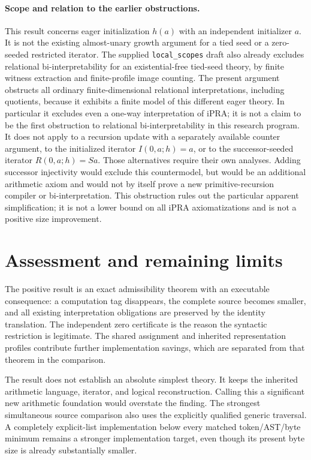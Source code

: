 \documentclass[11pt,letterpaper]{article}
\theoremstyle{definition}\newtheorem{definition}[theorem]{Definition}
\theoremstyle{remark}\newtheorem{remark}[theorem]{Remark}
\begin{document}
\paragraph{Scope and relation to the earlier obstructions.}
This result concerns eager initialization $h(a)$ with an independent
initializer $a$.  It is not the existing almost-unary growth argument
for a tied seed or a zero-seeded restricted iterator.  The supplied
\texttt{local\_scopes} draft also already excludes relational
bi-interpretability for an existential-free tied-seed theory, by finite
witness extraction and finite-profile image counting.  The present
argument obstructs all ordinary finite-dimensional relational
interpretations, including quotients, because it exhibits a finite
model of this different eager theory.  In particular it excludes even
a one-way interpretation of iPRA; it is not a claim to be the first
obstruction to relational bi-interpretability in this research program.
It does not apply to a recursion
update with a separately available counter argument, to the initialized
iterator $I(0,a;h)=a$, or to the successor-seeded iterator
$R(0,a;h)=Sa$.  Those alternatives require their own analyses.
Adding successor injectivity would exclude this countermodel, but would
be an additional arithmetic axiom and would not by itself prove a new
primitive-recursion compiler or bi-interpretation.  This obstruction
rules out the particular apparent simplification; it is not a lower
bound on all iPRA axiomatizations and is not a positive size improvement.



\section{Assessment and remaining limits}

The positive result is an exact admissibility theorem with an executable
consequence: a computation tag disappears, the complete source becomes
smaller, and all existing interpretation obligations are preserved by
the identity translation. The independent zero certificate is the
reason the syntactic restriction is legitimate. The shared assignment
and inherited representation profiles contribute further implementation
savings, which are separated from that theorem in the comparison.

The result does not establish an absolute simplest theory. It keeps the
inherited arithmetic language, iterator, and logical reconstruction.
Calling this a significant new arithmetic foundation would overstate
the finding. The strongest simultaneous source comparison also uses the
explicitly qualified generic traversal. A completely explicit-list
implementation below every matched token/AST/byte minimum remains a
stronger implementation target, even though its present byte size is
already substantially smaller.
\end{document}
